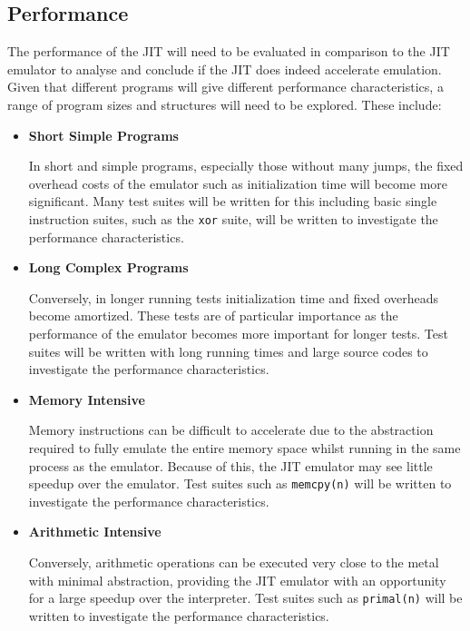\subsection{Performance}

The performance of the JIT will need to be evaluated in comparison to the JIT emulator to analyse and conclude if the JIT does indeed accelerate emulation. Given that different programs will give different performance characteristics, a range of program sizes and structures will need to be explored. These include:

\begin{itemize}
    \item \textbf{Short Simple Programs}
    
    In short and simple programs, especially those without many jumps, the fixed overhead costs of the emulator such as initialization time will become more significant. Many test suites will be written for this including basic single instruction suites, such as the \texttt{xor} suite, will be written to investigate the performance characteristics.
    
    \item \textbf{Long Complex Programs}
    
    Conversely, in longer running tests initialization time and fixed overheads become amortized. These tests are of particular importance as the performance of the emulator becomes more important for longer tests. Test suites will be written with long running times and large source codes to investigate the performance characteristics.

    \item \textbf{Memory Intensive}
    
    Memory instructions can be difficult to accelerate due to the abstraction required to fully emulate the entire memory space whilst running in the same process as the emulator. Because of this, the JIT emulator may see little speedup over the emulator. Test suites such as \texttt{memcpy(n)} will be written to investigate the performance characteristics.

    \item \textbf{Arithmetic Intensive}
    
    Conversely, arithmetic operations can be executed very close to the metal with minimal abstraction, providing the JIT emulator with an opportunity for a large speedup over the interpreter. Test suites such as \texttt{primal(n)} will be written to investigate the performance characteristics.


\end{itemize}
